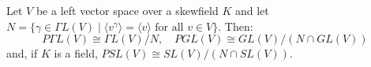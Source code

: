 Let $V$ be a left vector space over a skewfield $K$ and let $N = \{\gamma \in \Gamma L(V) \mid \langle v^\gamma \rangle = \langle v \rangle \text{ for all } v \in V\}$. Then:
$$P\Gamma L(V) \cong \Gamma L(V)/N, \quad PGL(V) \cong GL(V)/(N \cap GL(V))$$
and, if $K$ is a field, $PSL(V) \cong SL(V)/(N \cap SL(V))$.

